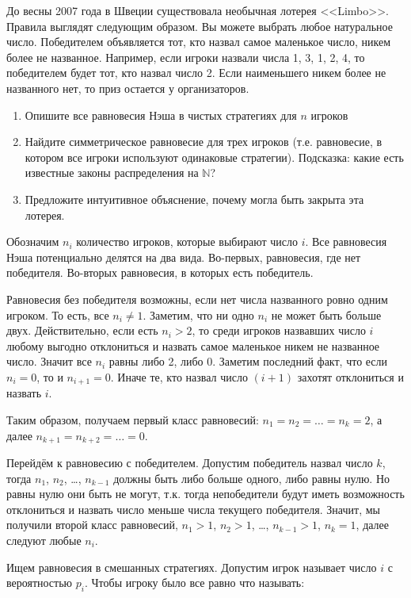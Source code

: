 \begin{problem}
До весны 2007 года в Швеции существовала необычная лотерея <<Limbo>>. Правила выглядят следующим образом. Вы можете выбрать любое натуральное число. Победителем объявляется тот, кто назвал самое маленькое число, никем более не названное. Например, если игроки назвали числа 1, 3, 1, 2, 4, то победителем будет тот, кто назвал число 2. Если наименьшего никем более не названного нет, то приз остается у организаторов.
\begin{enumerate}
\item  Опишите все равновесия Нэша в чистых стратегиях для $n$ игроков
\item  Найдите симметрическое равновесие для трех игроков (т.е. равновесие, в котором все игроки используют одинаковые стратегии). Подсказка: какие есть известные законы распределения на $\mathbb{N}$?
\item Предложите интуитивное объяснение, почему могла быть закрыта эта лотерея.

\end{enumerate}


\begin{sol}
Обозначим $n_i$ количество игроков, которые выбирают число $i$. Все равновесия Нэша потенциально делятся на два вида. Во-первых, равновесия, где нет победителя. Во-вторых равновесия, в которых есть победитель.

Равновесия без победителя возможны, если нет числа названного ровно одним игроком. То есть, все $n_i\neq 1$. Заметим, что ни одно $n_i$ не может быть больше двух.  Действительно, если есть $n_i>2$, то среди игроков назвавших число $i$ любому выгодно отклониться и назвать самое маленькое никем не названное число. Значит все $n_i$ равны либо 2, либо 0. Заметим последний факт, что если $n_i=0$, то и $n_{i+1}=0$. Иначе те, кто назвал число $(i+1)$ захотят отклониться и назвать $i$.

Таким образом, получаем первый класс равновесий: $n_1=n_2=\ldots=n_{k}=2$, а далее $n_{k+1}=n_{k+2}=\ldots=0$.

Перейдём к равновесию с победителем.  Допустим победитель назвал число $k$, тогда $n_1$, $n_2$, \ldots, $n_{k-1}$ должны быть либо больше одного, либо равны нулю. Но равны нулю они быть не могут, т.к. тогда непобедители будут иметь возможность отклониться и назвать число меньше числа текущего победителя. Значит, мы получили второй класс равновесий, $n_1>1$, $n_2>1$, \ldots, $n_{k-1}>1$, $n_k=1$, далее следуют любые $n_i$.

Ищем равновесия в смешанных стратегиях. Допустим игрок называет число $i$  с вероятностью $p_i$. Чтобы игроку было все равно что называть:



\end{sol}
\end{problem}
